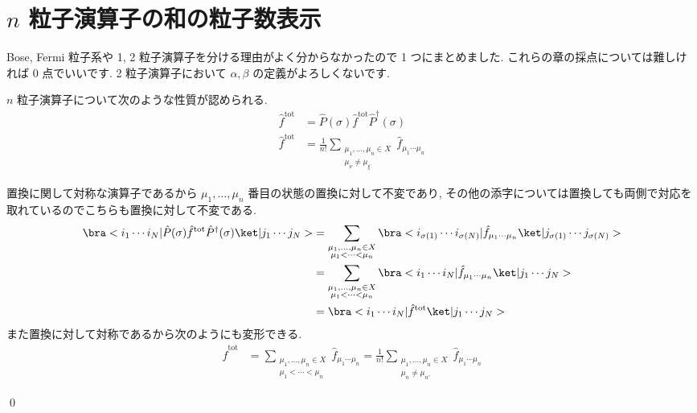 \documentclass[uplatex,dvipdfmx,a4paper,11pt]{jlreq}
\makeatletter
\numberwithin{equation}{section}
\theoremstyle{definition}
\renewenvironment{proof}[1][\proofname]{\par
  \normalfont
  \topsep6\p@\@plus6\p@ \trivlist
  \item[\hskip\labelsep{\bfseries #1}\@addpunct{\bfseries}]\ignorespaces\quad\par
}{
  \qed\endtrivlist\@endpefalse
}
\renewcommand\proofname{証明}
\makeatother
\begin{document}
\section{$n$ 粒子演算子の和の粒子数表示}
Bose, Fermi 粒子系や 1, 2 粒子演算子を分ける理由がよく分からなかったので 1 つにまとめました. これらの章の採点については難しければ 0 点でいいです.
2 粒子演算子において $\alpha, \beta$ の定義がよろしくないです.

\begin{theorem}
  $n$ 粒子演算子について次のような性質が認められる.
  \begin{align}
    \hat{f}^{\mathrm{tot}} & = \hat{P}(\sigma)\hat{f}^{\mathrm{tot}}\hat{P}^\dagger(\sigma) \\
    \hat{f}^{\mathrm{tot}} & = \frac{1}{n!}\sum_{\substack{\mu_1,\ldots,\mu_n\in X          \\ \mu_\nu \neq \mu_\xi}}\hat{f}_{\mu_1\cdots\mu_n}
  \end{align}
\end{theorem}
\begin{proof}
  置換に関して対称な演算子であるから $\mu_1,\ldots,\mu_n$ 番目の状態の置換に対して不変であり, その他の添字については置換しても両側で対応を取れているのでこちらも置換に対して不変である.
  \begin{align}
    \bra<i_1\cdots i_N|\hat{P}(\sigma)\hat{f}^{\mathrm{tot}}\hat{P}^\dagger(\sigma)\ket|j_1\cdots j_N> & = \sum_{\substack{\mu_1,\ldots,\mu_n\in X                      \\ \mu_1 < \cdots < \mu_n }}\bra<i_{\sigma(1)}\cdots i_{\sigma(N)}|\hat{f}_{\mu_1\cdots\mu_n}\ket|j_{\sigma(1)}\cdots j_{\sigma(N)}> \\
                                                                                                       & = \sum_{\substack{\mu_1,\ldots,\mu_n\in X                      \\ \mu_1 < \cdots < \mu_n }}\bra<i_1\cdots i_N|\hat{f}_{\mu_1\cdots\mu_n}\ket|j_1\cdots j_N> \\
                                                                                                       & = \bra<i_1\cdots i_N|\hat{f}^{\mathrm{tot}}\ket|j_1\cdots j_N>
  \end{align}
  また置換に対して対称であるから次のようにも変形できる.
  \begin{align}
    \hat{f}^{\mathrm{tot}} & = \sum_{\substack{\mu_1,\ldots,\mu_n\in X \\ \mu_1 < \cdots < \mu_n}}\hat{f}_{\mu_1\cdots\mu_n} = \frac{1}{n!}\sum_{\substack{\mu_1,\ldots,\mu_n\in X \\ \mu_n \neq \mu_{n'}}}\hat{f}_{\mu_1\cdots\mu_n}
  \end{align}
\end{proof}
\end{document}
